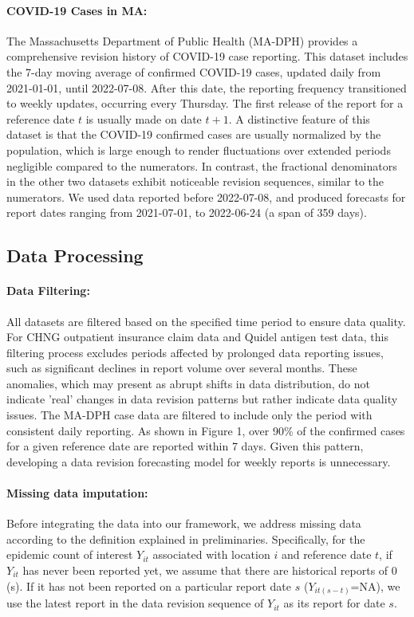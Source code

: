 \paragraph{COVID-19 Cases in MA:}
The Massachusetts Department of Public Health (MA-DPH) provides a comprehensive revision history of COVID-19 case reporting. This dataset includes the 7-day moving average of confirmed COVID-19 cases, updated daily from 2021-01-01, until 2022-07-08. After this date, the reporting frequency transitioned to weekly updates, occurring every Thursday. The first release of the report for a reference date \( t \) is usually made on date \( t+1 \). A distinctive feature of this dataset is that the COVID-19 confirmed cases are usually normalized by the population, which is large enough to render fluctuations over extended periods negligible compared to the numerators. In contrast, the fractional denominators in the other two datasets exhibit noticeable revision sequences, similar to the numerators. We used data reported before 2022-07-08, and produced forecasts for report dates ranging from 2021-07-01, to 2022-06-24 (a span of 359 days).


\subsection{Data Processing}

\paragraph{Data Filtering:}
All datasets are filtered based on the specified time period to ensure data quality. For CHNG outpatient insurance claim data and Quidel antigen test data, this filtering process excludes periods affected by prolonged data reporting issues, such as significant declines in report volume over several months. These anomalies, which may present as abrupt shifts in data distribution, do not indicate 'real' changes in data revision patterns but rather indicate data quality issues. The MA-DPH case data are filtered to include only the period with consistent daily reporting. As shown in Figure 1, over 90\% of the confirmed cases for a given reference date are reported within 7 days. Given this pattern, developing a data revision forecasting model for weekly reports is unnecessary.

\paragraph{Missing data imputation:}
Before integrating the data into our framework, we address missing data according to the definition explained in preliminaries. Specifically, for the epidemic count of interest $Y_{it}$ associated with location $i$ and reference date $t$, if $Y_{it}$ has never been reported yet, we assume that there are historical reports of 0 (s). If it has not been reported on a particular report date $s$ ($Y_{it(s-t)}$=NA), we use the latest report in the data revision sequence of $Y_{it}$ as its report for date $s$. 

